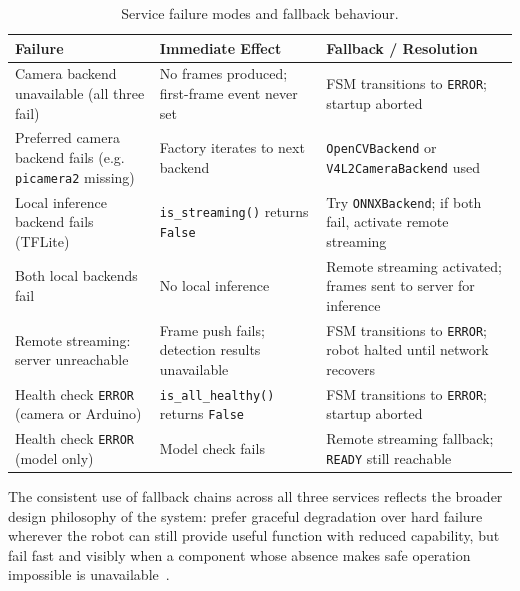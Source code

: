 \begin{table}[h]
	\centering
	\caption{Service failure modes and fallback behaviour.}
	\label{tab:fallback}
	\begin{tabular}{p{3.5cm} p{4cm} p{4.5cm}}
		\hline
		\textbf{Failure} & \textbf{Immediate Effect} & \textbf{Fallback / Resolution} \\
		\hline
		Camera backend unavailable (all three fail) &
		No frames produced; first-frame event never set &
		FSM transitions to \texttt{ERROR}; startup aborted \\
		Preferred camera backend fails (e.g. \texttt{picamera2} missing) &
		Factory iterates to next backend &
		\texttt{OpenCVBackend} or \texttt{V4L2CameraBackend} used \\
		Local inference backend fails (TFLite) &
		\texttt{is\_streaming()} returns \texttt{False} &
		Try \texttt{ONNXBackend}; if both fail, activate remote streaming \\
		Both local backends fail &
		No local inference &
		Remote streaming activated; frames sent to server for inference \\
		Remote streaming: server unreachable &
		Frame push fails; detection results unavailable &
		FSM transitions to \texttt{ERROR}; robot halted until network recovers \\
		Health check \texttt{ERROR} (camera or Arduino) &
		\texttt{is\_all\_healthy()} returns \texttt{False} &
		FSM transitions to \texttt{ERROR}; startup aborted \\
		Health check \texttt{ERROR} (model only) &
		Model check fails &
		Remote streaming fallback; \texttt{READY} still reachable \\
		\hline
	\end{tabular}
\end{table}

The consistent use of fallback chains across all three services
reflects the broader design philosophy of the system: prefer
graceful degradation over hard failure wherever the robot can still
provide useful function with reduced capability, but fail fast and
visibly when a component whose absence makes safe operation impossible
is unavailable~\cite{kopetz2011real,martin2008clean}.

%
%



